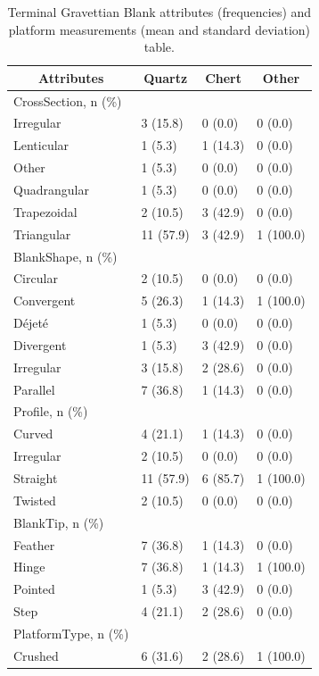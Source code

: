 \documentclass[12pt,twoside]{reedthesis}
\begin{document}
\begin{longtable}[t]{llll}
\caption{\label{tab:unnamed-chunk-73}Terminal Gravettian Blank attributes (frequencies) and platform measurements (mean and standard deviation) table.}\\
\toprule
\multicolumn{1}{c}{\textbf{Attributes}} & \multicolumn{1}{c}{\textbf{Quartz}} & \multicolumn{1}{c}{\textbf{Chert}} & \multicolumn{1}{c}{\textbf{Other}}\\
\midrule
CrossSection, n (\%) &  &  & \\
Irregular & 3 (15.8) & 0 (0.0) & 0 (0.0)\\
Lenticular & 1 (5.3) & 1 (14.3) & 0 (0.0)\\
Other & 1 (5.3) & 0 (0.0) & 0 \vphantom{1} (0.0)\\
Quadrangular & 1 (5.3) & 0 (0.0) & 0 (0.0)\\
\addlinespace
Trapezoidal & 2 (10.5) & 3 (42.9) & 0 (0.0)\\
Triangular & 11 (57.9) & 3 (42.9) & 1 (100.0)\\
BlankShape, n (\%) &  &  & \\
Circular & 2 (10.5) & 0 (0.0) & 0 (0.0)\\
Convergent & 5 (26.3) & 1 (14.3) & 1 (100.0)\\
\addlinespace
Déjeté & 1 (5.3) & 0 (0.0) & 0 (0.0)\\
Divergent & 1 (5.3) & 3 (42.9) & 0 (0.0)\\
Irregular & 3 (15.8) & 2 (28.6) & 0 (0.0)\\
Parallel & 7 (36.8) & 1 (14.3) & 0 (0.0)\\
Profile, n (\%) &  &  & \\
\addlinespace
Curved & 4 (21.1) & 1 (14.3) & 0 (0.0)\\
Irregular & 2 (10.5) & 0 (0.0) & 0 (0.0)\\
Straight & 11 (57.9) & 6 (85.7) & 1 (100.0)\\
Twisted & 2 (10.5) & 0 (0.0) & 0 (0.0)\\
BlankTip, n (\%) &  &  & \\
\addlinespace
Feather & 7 (36.8) & 1 (14.3) & 0 (0.0)\\
Hinge & 7 (36.8) & 1 (14.3) & 1 (100.0)\\
Pointed & 1 (5.3) & 3 (42.9) & 0 (0.0)\\
Step & 4 (21.1) & 2 (28.6) & 0 (0.0)\\
PlatformType, n (\%) &  &  & \\
\addlinespace
Crushed & 6 (31.6) & 2 (28.6) & 1 (100.0)\\

\end{longtable}
\end{document}
